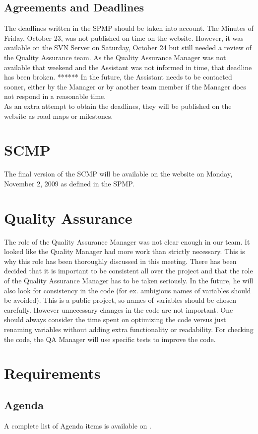 \documentclass[a4paper, 12pt]{article}
\begin{document}
	\subsection{Agreements and Deadlines}
The deadlines written in the SPMP should be taken into account. The Minutes of Friday, October 23, was not published on time on the website. However, it was available on the SVN Server on Saturday, October 24 but  still needed a review of the Quality Assurance team. As the Quality Assurance Manager was not available that weekend and the Assistant was not informed in time, that deadline has been broken. ****** In the future, the Assistant needs to be contacted sooner, either by the Manager or by another team member if the Manager does not respond in a reasonable time.\\
As an extra attempt to obtain the deadlines, they will be published on the website as road maps or milestones.
	\section{SCMP}
The final version of the SCMP will be available on the website on Monday, November 2, 2009 as defined in the SPMP.
	\section{Quality Assurance}
The role of the Quality Assurance Manager was not clear enough in our team. It looked like the Quality Manager had more work than strictly necessary. This is why this role has been thoroughly discussed in this meeting. There has been decided that it is important to be consistent all over the project and that the role of the Quality Assurance Manager has to be taken seriously. In the future, he will also look for consistency in the code (for ex. ambigious names of variables should be avoided). This is a public project, so names of variables should be chosen carefully. However unnecessary changes in the code are not important. One should always consider the time spent on optimizing the code versus just renaming variables without adding extra functionality or readability. For checking the code, the QA Manager will use specific tests to improve the code.
	\section{Requirements}

	\subsection{Agenda}
	A complete list of Agenda items is available on \cite{site4}.
\end{document}
